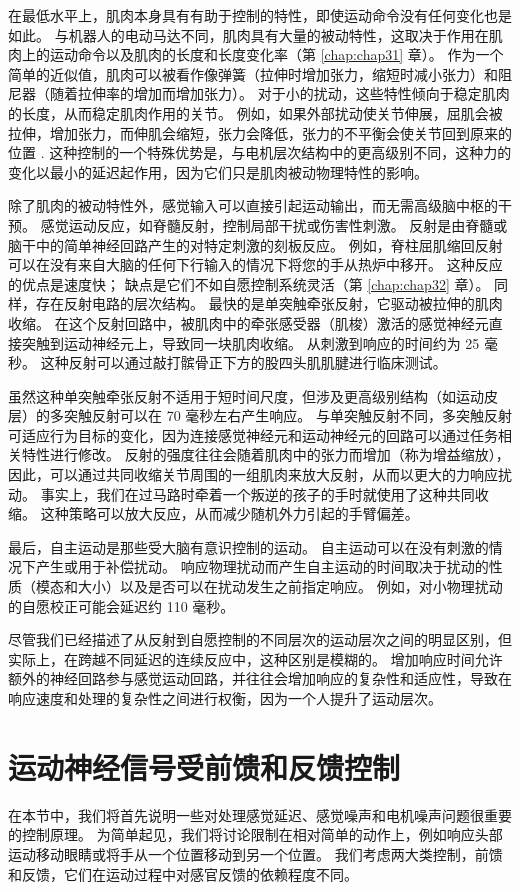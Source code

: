 在最低水平上，肌肉本身具有有助于控制的特性，即使运动命令没有任何变化也是如此。
与机器人的电动马达不同，肌肉具有大量的被动特性，这取决于作用在肌肉上的运动命令以及肌肉的长度和长度变化率（第 \ref{chap:chap31} 章）。
作为一个简单的近似值，肌肉可以被看作像弹簧（拉伸时增加张力，缩短时减小张力）和阻尼器（随着拉伸率的增加而增加张力）。
对于小的扰动，这些特性倾向于稳定肌肉的长度，从而稳定肌肉作用的关节。
例如，如果外部扰动使关节伸展，屈肌会被拉伸，增加张力，而伸肌会缩短，张力会降低，张力的不平衡会使关节回到原来的位置 . 这种控制的一个特殊优势是，与电机层次结构中的更高级别不同，这种力的变化以最小的延迟起作用，因为它们只是肌肉被动物理特性的影响。


除了肌肉的被动特性外，感觉输入可以直接引起运动输出，而无需高级脑中枢的干预。
感觉运动反应，如脊髓反射，控制局部干扰或伤害性刺激。
反射是由脊髓或脑干中的简单神经回路产生的对特定刺激的刻板反应。
例如，脊柱屈肌缩回反射可以在没有来自大脑的任何下行输入的情况下将您的手从热炉中移开。
这种反应的优点是速度快； 缺点是它们不如自愿控制系统灵活（第 \ref{chap:chap32} 章）。
同样，存在反射电路的层次结构。
最快的是单突触牵张反射，它驱动被拉伸的肌肉收缩。 
在这个反射回路中，被肌肉中的牵张感受器（肌梭）激活的感觉神经元直接突触到运动神经元上，导致同一块肌肉收缩。
从刺激到响应的时间约为 25 毫秒。 这种反射可以通过敲打髌骨正下方的股四头肌肌腱进行临床测试。


虽然这种单突触牵张反射不适用于短时间尺度，但涉及更高级别结构（如运动皮层）的多突触反射可以在 70 毫秒左右产生响应。
与单突触反射不同，多突触反射可适应行为目标的变化，因为连接感觉神经元和运动神经元的回路可以通过任务相关特性进行修改。
反射的强度往往会随着肌肉中的张力而增加（称为增益缩放），因此，可以通过共同收缩关节周围的一组肌肉来放大反射，从而以更大的力响应扰动。
事实上，我们在过马路时牵着一个叛逆的孩子的手时就使用了这种共同收缩。
这种策略可以放大反应，从而减少随机外力引起的手臂偏差。


最后，自主运动是那些受大脑有意识控制的运动。
自主运动可以在没有刺激的情况下产生或用于补偿扰动。 
响应物理扰动而产生自主运动的时间取决于扰动的性质（模态和大小）以及是否可以在扰动发生之前指定响应。 
例如，对小物理扰动的自愿校正可能会延迟约 110 毫秒。


尽管我们已经描述了从反射到自愿控制的不同层次的运动层次之间的明显区别，但实际上，在跨越不同延迟的连续反应中，这种区别是模糊的。
增加响应时间允许额外的神经回路参与感觉运动回路，并往往会增加响应的复杂性和适应性，导致在响应速度和处理的复杂性之间进行权衡，因为一个人提升了运动层次。



\section{运动神经信号受前馈和反馈控制}
在本节中，我们将首先说明一些对处理感觉延迟、感觉噪声和电机噪声问题很重要的控制原理。 
为简单起见，我们将讨论限制在相对简单的动作上，例如响应头部运动移动眼睛或将手从一个位置移动到另一个位置。
我们考虑两大类控制，前馈和反馈，它们在运动过程中对感官反馈的依赖程度不同。




